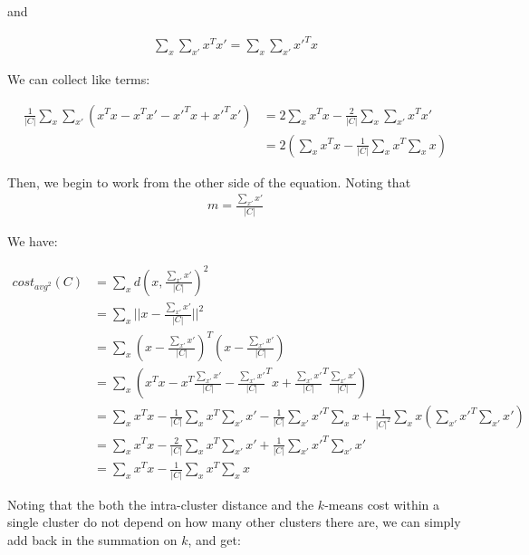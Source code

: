 \documentclass{article}
\begin{document}
\begin{enumerate}
and 

\begin{align*}
  \sum\limits_{x} \sum\limits_{x'} x^Tx' = \sum\limits_{x} \sum\limits_{x'} x'^Tx
\end{align*}


We can collect like terms:

\begin{align*}
  \frac 1 {|C|} \sum\limits_{x} \sum\limits_{x'} (x^Tx - x^Tx' - x'^Tx + x'^Tx') &= 2\sum\limits_x x^Tx - \frac 2 {|C|} \sum\limits_{x} \sum\limits_{x'} x^Tx'\\
   &= 2(\sum\limits_x x^Tx - \frac 1 {|C|} \sum\limits_{x} x^T \sum\limits_{x} x)
 \end{align*}
 
Then, we begin to work from the other side of the equation. Noting
that 
\begin{align*}
  m = \frac {\sum\limits_{x'} x'} {|C|}
\end{align*}

We have:

\begin{align*}
  cost_{avg^2}(C) &= \sum\limits_{x} d(x, \frac {\sum\limits_{x'} x'} {|C|})^2\\
  &= \sum\limits_{x} ||x - \frac {\sum\limits_{x'} x'} {|C|}||^2\\
  &= \sum\limits_{x} (x - \frac {\sum\limits_{x'} x'} {|C|})^T (x - \frac {\sum\limits_{x'} x'} {|C|})\\
    &= \sum\limits_{x} (x^Tx - x^T \frac {\sum\limits_{x'} x'} {|C|} - \frac {\sum\limits_{x'} x'} {|C|}^Tx + \frac {\sum\limits_{x'} x'} {|C|}^T \frac {\sum\limits_{x'} x'} {|C|})\\
    &= \sum\limits_{x} x^Tx - \frac 1 {|C|} \sum\limits_{x} x^T \sum\limits_{x'} x' -  \frac 1 {|C|}  \sum\limits_{x'} x'^T \sum\limits_{x} x +  \frac 1 {|C|^2} \sum\limits_{x} x (\sum\limits_{x'} x'^T \sum\limits_{x'} x')\\
   &= \sum\limits_{x} x^Tx - \frac 2 {|C|} \sum\limits_{x} x^T \sum\limits_{x'} x' +  \frac 1 {|C|} \sum\limits_{x'} x'^T \sum\limits_{x'} x'\\
   &= \sum\limits_{x} x^Tx - \frac 1 {|C|} \sum\limits_{x} x^T \sum\limits_{x} x 
\end{align*}

Noting that the both the
intra-cluster distance and the $k$-means cost within a single cluster
do not depend on how many other clusters there are, we can simply add
back in the summation on $k$, and get:


\end{enumerate}
\end{document}
